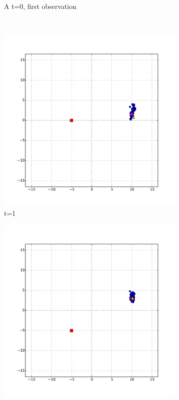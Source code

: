 \begin{figure}
\begin{subfigure}[b]{0.3\textwidth}
                \caption{A t=0, first observation}
                \label{fig:beam_bad_heading_t_0}
        \end{subfigure}
        ~ %
        \begin{subfigure}[b]{0.3\textwidth}
                \includegraphics[width=\textwidth]{beam_bad_heading_t_1}
                \caption{t=1}
                \label{fig:beam_bad_heading_t_1}
        \end{subfigure}
        \begin{subfigure}[b]{0.3\textwidth}
                \includegraphics[width=\textwidth]{beam_bad_heading_t_2}

\end{subfigure}
\end{figure}
